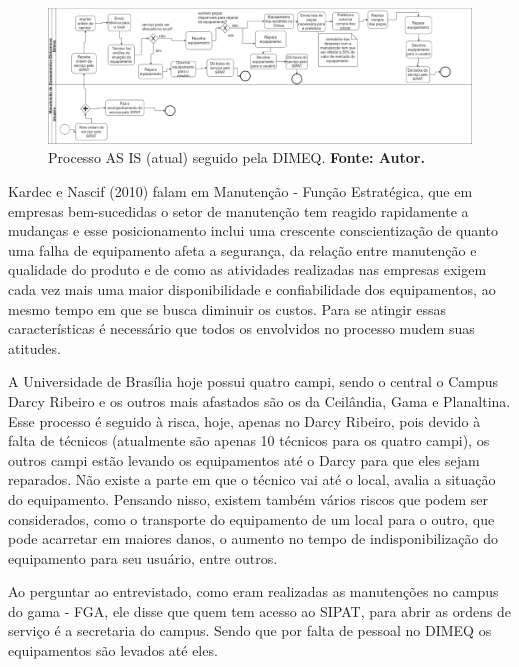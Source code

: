 \begin{landscape}
\graphicspath{{figuras/}}
\begin{figure}[H]
\centering
\includegraphics[width=1.5\textwidth]{processo_as_is}
\caption{Processo AS IS (atual) seguido pela DIMEQ. \textbf{Fonte: Autor.}}
\label{processo-as-is}
\end{figure}
\end{landscape} 


Kardec e Nascif (2010) falam em Manutenção - Função Estratégica, que em empresas bem-sucedidas o setor de manutenção tem reagido rapidamente a mudanças e esse posicionamento inclui uma crescente conscientização de quanto uma falha de equipamento afeta a segurança, da relação entre manutenção e qualidade do produto e de como as atividades realizadas nas empresas exigem cada vez mais uma maior disponibilidade e confiabilidade dos equipamentos, ao mesmo tempo em que se busca diminuir os custos. Para se atingir essas características é necessário que todos os envolvidos no processo mudem suas atitudes. 

A Universidade de Brasília hoje possui quatro campi, sendo o central o Campus Darcy Ribeiro e os outros mais afastados são os da Ceilândia, Gama e Planaltina. Esse processo é seguido à risca, hoje, apenas no Darcy Ribeiro, pois devido à falta de técnicos (atualmente são apenas 10 técnicos para os quatro campi), os outros campi estão levando os equipamentos até o Darcy para que eles sejam reparados. Não existe a parte em que o técnico vai até o local, avalia a situação do equipamento. Pensando nisso, existem também vários riscos que podem ser considerados, como o transporte do equipamento de um local para o outro, que pode acarretar em maiores danos, o aumento no tempo de indisponibilização do equipamento para seu usuário, entre outros. 

Ao perguntar ao entrevistado, como eram realizadas as manutenções no campus do gama - FGA, ele disse que quem tem acesso ao SIPAT, para abrir as ordens de serviço é a secretaria do campus. Sendo que por falta de pessoal no DIMEQ os equipamentos são levados até eles. 

